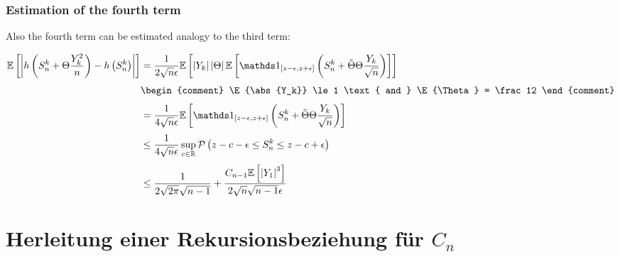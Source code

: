\subsubsection{Estimation of the fourth term}

Also the fourth term can be estimated analogy to the third term:

\begin{align}
  \E{\abs{ \h{ S_n^k+\Theta\frac{Y_k^2}{n} } - \h{ S_n^k } }}
  &= \frac{1}{2\sqrt n \epsilon} \E{ \abs{Y_k} \abs{\Theta} \E{ \cf[z-\epsilon]{z+\epsilon}{S_n^k + \tilde \Theta\Theta\frac{Y_k}{\sqrt n}} } } \nl
  &
  \begin{comment}
    \E{\abs{Y_k}} \le 1 \text{ and } \E{\Theta} = \frac 12
  \end{comment} \nl
  &= \frac{1}{4\sqrt n \epsilon} \E{ \cf[z-\epsilon]{z+\epsilon}{S_n^k + \tilde \Theta\Theta\frac{Y_k}{\sqrt n}} } \nl
  & \le \frac{1}{4\sqrt n \epsilon} \sup_{c\in\R} \P{z-c-\epsilon \le S_n^k \le z-c+\epsilon} \nl
  &\le \frac{1}{2\sqrt{2\pi}\sqrt{n-1}} + \frac{C_{n-1} \E{\abs{Y_1}^3} }{2\sqrt  n\sqrt{n-1}\epsilon}
\end{align}

\section{Herleitung einer Rekursionsbeziehung für $C_n$}


